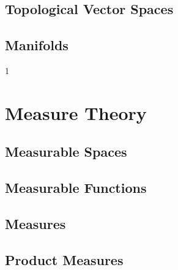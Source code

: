 \documentclass{book}                                                           %
\def\compileanalysis{0}
\begin{document}
                \chapter{Topological Vector Spaces}
                \chapter{Manifolds}
        \clearpage
        \setcounter{endpage}{\thepage}
    \else
        \addtocounter{part}{10}
        \addtocounter{chapter}{10}
    \fi

    \if\compileanalysis1
            \renewcommand{\TOPPATH}{books/Analysis}
            \label{book:Analysis}%
            \setcounter{page}{\value{endpage}}
            \part{Measure Theory}
                \renewcommand{\PARPATH}{\TOPPATH/Measure_Theory}
                \chapter{Measurable Spaces}
                    \renewcommand{\PATH}{\PARPATH/Measurable_Spaces}
                    
                    
                    
                    
                    
                    
                \chapter{Measurable Functions}
                    \renewcommand{\PATH}{\PARPATH/Measurable_Functions}
                    
                    
                \chapter{Measures}
                    \renewcommand{\PATH}{\PARPATH/Measures}
                    
                    
                \chapter{Product Measures}
                    \renewcommand{\PATH}{\PARPATH/Product_Measures}
                    
\end{document}
